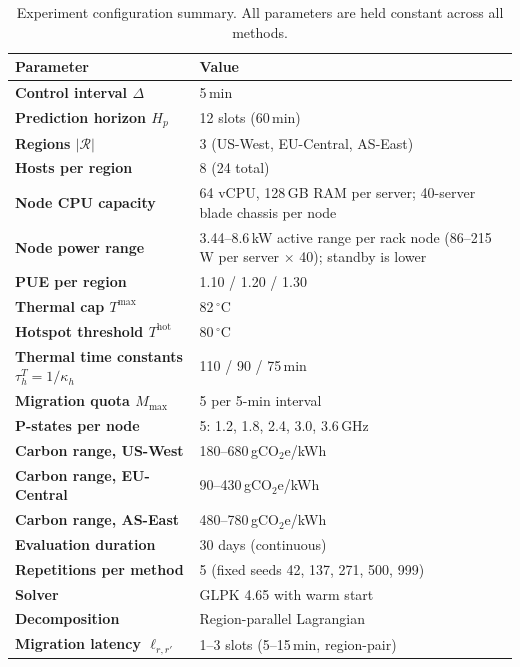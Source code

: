 \documentclass[a4paper,fleqn]{cas-dc}
\begin{document}
\begin{table}[!htb]
\centering
\caption{Experiment configuration summary. All parameters are held constant across all methods.}
\label{tab:setup}
\setlength{\tabcolsep}{6pt}
\renewcommand{\arraystretch}{1.3}
\footnotesize
\begin{tabular}{>{\bfseries}p{3.8cm} p{4.4cm}}
\toprule
\normalfont\textbf{Parameter} & \textbf{Value} \\
\midrule
\rowcolor{black!5} Control interval $\Delta$ & 5\,min \\
Prediction horizon $H_p$ & 12 slots (60\,min) \\
\rowcolor{black!5} Regions $|\mathcal{R}|$ & 3 (US-West, EU-Central, AS-East) \\
Hosts per region & 8 (24 total) \\
\rowcolor{black!5} Node CPU capacity & 64 vCPU, 128\,GB RAM per server; 40-server blade chassis per node \\
Node power range & 3.44--8.6\,kW active range per rack node (86--215\,W per server $\times$ 40); standby is lower \\
\rowcolor{black!5} PUE per region & 1.10 / 1.20 / 1.30 \\
Thermal cap $T^{\max}$ & 82\,$^\circ$C \\
\rowcolor{black!5} Hotspot threshold $T^{\mathrm{hot}}$ & 80\,$^\circ$C \\
Thermal time constants $\tau^T_h = 1/\kappa_h$ & 110 / 90 / 75\,min \\
\rowcolor{black!5} Migration quota $M_{\max}$ & 5 per 5-min interval \\
P-states per node & 5: 1.2, 1.8, 2.4, 3.0, 3.6\,GHz \\
\rowcolor{black!5} Carbon range, US-West & 180--680\,gCO$_2$e/kWh \\
Carbon range, EU-Central & 90--430\,gCO$_2$e/kWh \\
\rowcolor{black!5} Carbon range, AS-East & 480--780\,gCO$_2$e/kWh \\
Evaluation duration & 30 days (continuous) \\
\rowcolor{black!5} Repetitions per method & 5 (fixed seeds 42, 137, 271, 500, 999) \\
Solver & GLPK 4.65 with warm start \\
\rowcolor{black!5} Decomposition & Region-parallel Lagrangian \\
Migration latency $\ell_{r,r'}$ & 1--3 slots (5--15\,min, region-pair) \\
\bottomrule
\end{tabular}
\end{table}
\end{document}
